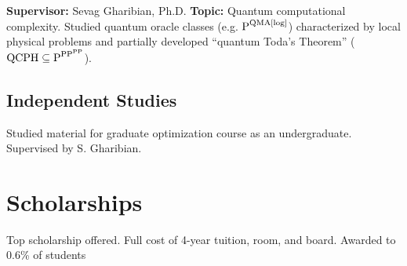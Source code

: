 \documentclass[11pt,letterpaper,serif]{moderncv}
\begin{document}
{
	\begin{adjustwidth}{.25in}{}
		\textbf{Supervisor:} Sevag Gharibian, Ph.D. \newline
		\textbf{Topic:} Quantum computational complexity. Studied quantum oracle classes  (e.g. {\scriptsize $\textup{P}^{\textup{QMA[log]}}$}) characterized by local physical problems and partially developed ``quantum Toda's Theorem'' ({\scriptsize $\textup{QCPH}\subseteq \textup{P}^{\textup{PP}^{\textup{PP}}}$}).
	\end{adjustwidth}
}

\printbibliography[heading=subbibliography, title={Preprints}, keyword=preprint]

\printbibliography[heading=subbibliography, title={Journal Publications}, keyword=publication]

\printbibliography[heading=subbibliography, title={Conference Presentations}, keyword=conference]

\printbibliography[heading=subbibliography, title={Department Seminars}, keyword=seminar]

\subsection{Independent Studies}
{
	\begin{adjustwidth}{.25in}{}
		Studied material for graduate optimization course as an undergraduate. Supervised by S. Gharibian.
	\end{adjustwidth}
}


\section{Scholarships \hspace{2em}{\footnotesize (all dollar amounts in USD)}} 
{	
\begin{adjustwidth}{.25in}{}
	Top scholarship offered. Full cost of 4-year tuition, room, and board. \newline
	Awarded to 0.6\% of students
\end{adjustwidth}
}
\end{document}
